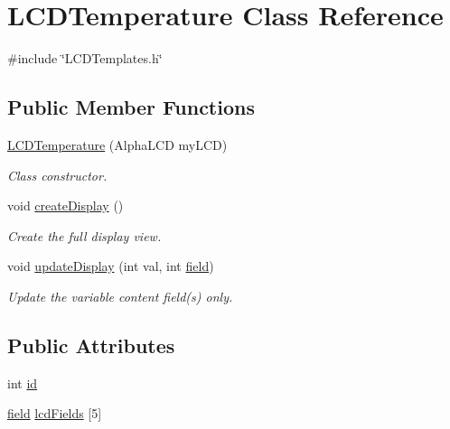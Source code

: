 \hypertarget{class_l_c_d_temperature}{\section{L\-C\-D\-Temperature Class Reference}
\label{class_l_c_d_temperature}
}


{\ttfamily \#include \char`\"{}L\-C\-D\-Templates.\-h\char`\"{}}

\subsection*{Public Member Functions}
\begin{DoxyCompactItemize}
\item 
\hyperlink{class_l_c_d_temperature_aa950e7815962ecf6e9c320ce43d21b51}{L\-C\-D\-Temperature} (Alpha\-L\-C\-D my\-L\-C\-D)
\begin{DoxyCompactList}\small\item\em Class constructor. \end{DoxyCompactList}\item 
void \hyperlink{class_l_c_d_temperature_a1171897993e5487965f9c90e092fc534}{create\-Display} ()
\begin{DoxyCompactList}\small\item\em Create the full display view. \end{DoxyCompactList}\item 
void \hyperlink{class_l_c_d_temperature_a2d7e6f602cef3facd2ca6ebe61c59041}{update\-Display} (int val, int \hyperlink{_l_c_d_templates_8h_a20a49e010fbfc3a43959f12d92e01bb6}{field})
\begin{DoxyCompactList}\small\item\em Update the variable content field(s) only. \end{DoxyCompactList}\end{DoxyCompactItemize}
\subsection*{Public Attributes}
\begin{DoxyCompactItemize}
\item 
int \hyperlink{class_l_c_d_temperature_a9283508ad2db7e2b155421e8a046682a}{id}
\item 
\hyperlink{_l_c_d_templates_8h_a20a49e010fbfc3a43959f12d92e01bb6}{field} \hyperlink{class_l_c_d_temperature_a933b7d2e4de573cc08de1d76b6779259}{lcd\-Fields} \mbox{[}5\mbox{]}
\end{DoxyCompactItemize}
